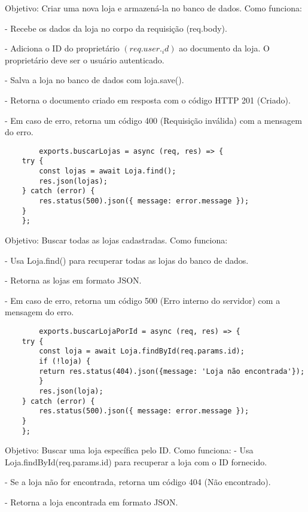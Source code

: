 Objetivo: Criar uma nova loja e armazená-la no banco de dados.
Como funciona:

- Recebe os dados da loja no corpo da requisição (req.body).

- Adiciona o ID do proprietário $(req.user._id)$ ao documento da loja. O proprietário deve ser o usuário autenticado.

- Salva a loja no banco de dados com loja.save().

- Retorna o documento criado em resposta com o código HTTP 201 (Criado).

- Em caso de erro, retorna um código 400 (Requisição inválida) com a mensagem do erro.

\vspace{1cm}
\begin{lstlisting}
        exports.buscarLojas = async (req, res) => {
    try {
        const lojas = await Loja.find();
        res.json(lojas);
    } catch (error) {
        res.status(500).json({ message: error.message });
    }
    };  
\end{lstlisting}
\vspace{1cm}

Objetivo: Buscar todas as lojas cadastradas.
Como funciona:

- Usa Loja.find() para recuperar todas as lojas do banco de dados.

- Retorna as lojas em formato JSON.

- Em caso de erro, retorna um código 500 (Erro interno do servidor) com a mensagem do erro.

\vspace{1cm}
\begin{lstlisting}
        exports.buscarLojaPorId = async (req, res) => {
    try {
        const loja = await Loja.findById(req.params.id);
        if (!loja) {
        return res.status(404).json({message: 'Loja não encontrada'});
        }
        res.json(loja);
    } catch (error) {
        res.status(500).json({ message: error.message });
    }
    };
\end{lstlisting}
\vspace{1cm}

Objetivo: Buscar uma loja específica pelo ID.
Como funciona:
- Usa Loja.findById(req.params.id) para recuperar a loja com o ID fornecido.

- Se a loja não for encontrada, retorna um código 404 (Não encontrado).

- Retorna a loja encontrada em formato JSON.

